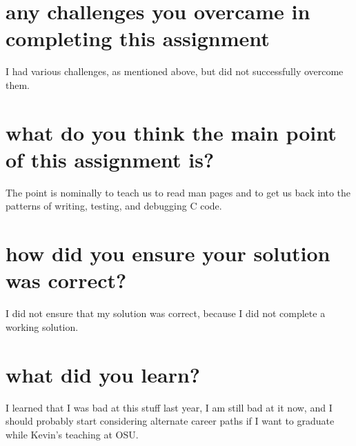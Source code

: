 \documentclass[10pt]{article}
\begin{document}
\section{any challenges you overcame in completing this assignment}

I had various challenges, as mentioned above, but did not successfully
overcome them.

\section{what do you think the main point of this assignment is?}

The point is nominally to teach us to read man pages and to get us back into
the patterns of writing, testing, and debugging C code. 

\section{how did you ensure your solution was correct?}

I did not ensure that my solution was correct, because I did not complete a
working solution.

\section{what did you learn?}

I learned that I was bad at this stuff last year, I am still bad at it now,
and I should probably start considering alternate career paths if I want to
graduate while Kevin's teaching at OSU.
\end{document}
